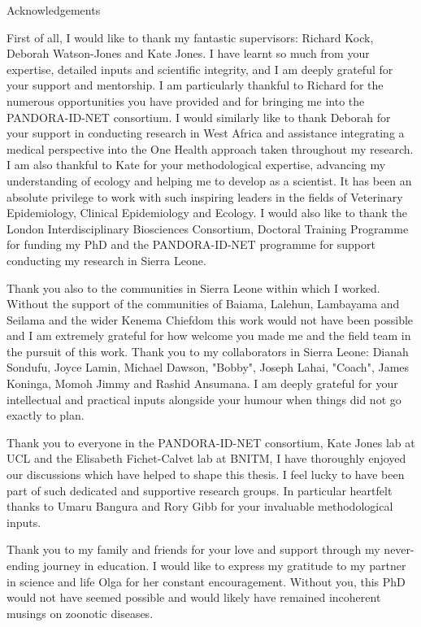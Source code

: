 \newpage

\Large

Acknowledgements

\normalsize

First of all, I would like to thank my fantastic supervisors: Richard Kock, Deborah Watson-Jones and Kate Jones. I have learnt so much from your expertise, detailed inputs and scientific integrity, and I am deeply grateful for your support and mentorship. I am particularly thankful to Richard for the numerous opportunities you have provided and for bringing me into the PANDORA-ID-NET consortium. I would similarly like to thank Deborah for your support in conducting research in West Africa and assistance integrating a medical perspective into the One Health approach taken throughout my research. I am also thankful to  Kate for your methodological expertise, advancing my understanding of ecology and helping me to develop as a scientist. It has been an absolute privilege to work with such inspiring leaders in the fields of Veterinary Epidemiology, Clinical Epidemiology and Ecology. I would also like to thank the London Interdisciplinary Biosciences Consortium, Doctoral Training Programme for funding my PhD and the PANDORA-ID-NET programme for support conducting my research in Sierra Leone.
\par
Thank you also to the communities in Sierra Leone within which I worked. Without the support of the communities of Baiama, Lalehun, Lambayama and Seilama and the wider Kenema Chiefdom this work would not have been possible and I am extremely grateful for how welcome you made me and the field team in the pursuit of this work. Thank you to my collaborators in Sierra Leone: Dianah Sondufu, Joyce Lamin, Michael Dawson, "Bobby", Joseph Lahai, "Coach", James Koninga, Momoh Jimmy and Rashid Ansumana. I am deeply grateful for your intellectual and practical inputs alongside your humour when things did not go exactly to plan.
\par
Thank you to everyone in the PANDORA-ID-NET consortium, Kate Jones lab at UCL and the Elisabeth Fichet-Calvet lab at BNITM, I have thoroughly enjoyed our discussions which have helped to shape this thesis. I feel lucky to have been part of such dedicated and supportive research groups. In particular heartfelt thanks to Umaru Bangura and Rory Gibb for your invaluable methodological inputs.
\par
Thank you to my family and friends for your love and support through my never-ending journey in education. I would like to express my gratitude to my partner in science and life Olga for her constant encouragement. Without you, this PhD would not have seemed possible and would likely have remained incoherent musings on zoonotic diseases.

\newpage